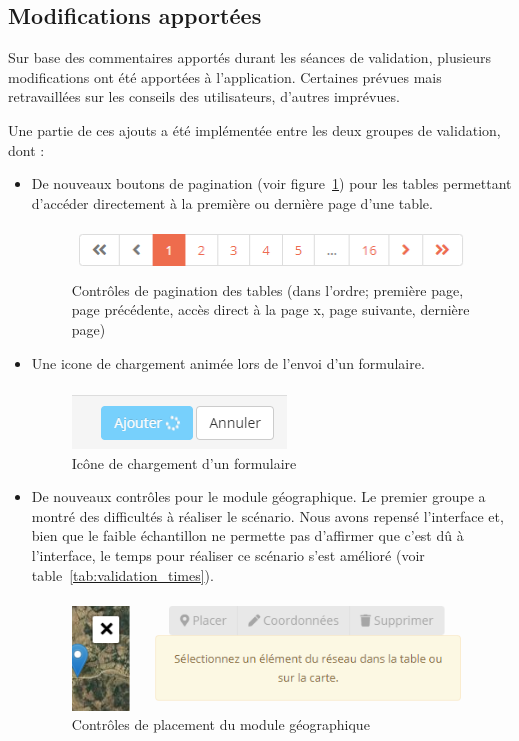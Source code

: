 \documentclass{EPL-master-thesis-covers-FR}
\begin{document}
			\subsection*{Modifications apportées}
				Sur base des commentaires apportés durant les séances de validation, plusieurs modifications ont été apportées à l'application. Certaines prévues mais retravaillées sur les conseils des utilisateurs, d'autres imprévues.

				Une partie de ces ajouts a été implémentée entre les deux groupes de validation, dont :
				\begin{itemize}
					\item De nouveaux boutons de pagination (voir figure~\ref{fig:screen_pagination}) pour les tables permettant d'accéder directement à la première ou dernière page d'une table.
						\begin{figure}[H]
							\centering
							\includegraphics[scale=0.75]{images/screen_pagination.png}
							\caption{Contrôles de pagination des tables (dans l'ordre; première page, page précédente, accès direct à la page x, page suivante, dernière page)}
							\label{fig:screen_pagination}
						\end{figure}
					\item Une icone de chargement animée lors de l'envoi d'un formulaire.
						\begin{figure}[H]
							\centering
							\includegraphics[scale=0.75]{images/screen_loading.png}
							\caption{Icône de chargement d'un formulaire}
							\label{fig:screen_loading}
						\end{figure}
					\item De nouveaux contrôles pour le module géographique. Le premier groupe a montré des difficultés à réaliser le scénario. Nous avons repensé l'interface et, bien que le faible échantillon ne permette pas d'affirmer que c'est dû à l'interface, le temps pour réaliser ce scénario s'est amélioré (voir table~\ref{tab:validation_times}).
						\begin{figure}[H]
							\centering
							\includegraphics[scale=0.75]{images/screen_gis_small.png}
							\caption{Contrôles de placement du module géographique}
							\label{fig:screen_gis_small}
						\end{figure}
				\end{itemize}
\end{document}
